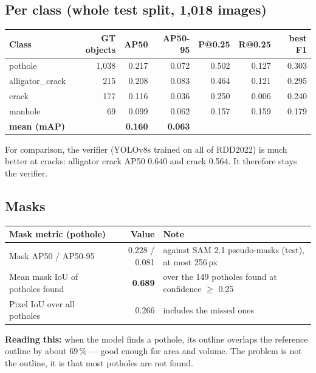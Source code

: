 \documentclass[11pt,a4paper]{article}
\begin{document}
\subsection{Per class (whole test split, 1,018 images)}
\begin{center}
\small
\begin{tabular}{@{}l r r r r r r@{}}
\toprule
\textbf{Class} & \textbf{GT objects} & \textbf{AP50} & \textbf{AP50-95} & \textbf{P@0.25} & \textbf{R@0.25} & \textbf{best F1}\\
\midrule
pothole & 1,038 & 0.217 & 0.072 & 0.502 & 0.127 & 0.303\\
alligator\_crack & 215 & 0.208 & 0.083 & 0.464 & 0.121 & 0.295\\
crack & 177 & 0.116 & 0.036 & 0.250 & 0.006 & 0.240\\
manhole & 69 & 0.099 & 0.062 & 0.157 & 0.159 & 0.179\\
\midrule
\textbf{mean (mAP)} & & \textbf{0.160} & \textbf{0.063} & & & \\
\bottomrule
\end{tabular}
\end{center}
For comparison, the verifier (YOLOv8s trained on all of RDD2022) is much better at cracks: alligator crack AP50 0.640
and crack 0.564. It therefore stays the verifier.

\subsection{Masks}
\begin{center}
\small
\begin{tabular}{@{}l r l@{}}
\toprule
\textbf{Mask metric (pothole)} & \textbf{Value} & \textbf{Note}\\
\midrule
Mask AP50 / AP50-95 & 0.228 / 0.081 & against SAM 2.1 pseudo-masks (test), at most 256\,px\\
Mean mask IoU of potholes found & \textbf{0.689} & over the 149 potholes found at confidence $\ge$ 0.25\\
Pixel IoU over all potholes & 0.266 & includes the missed ones\\
\bottomrule
\end{tabular}
\end{center}
\textbf{Reading this:} when the model finds a pothole, its outline overlaps the reference outline by about 69\,\% ---
good enough for area and volume. The problem is not the outline, it is that most potholes are not found.
\end{document}
